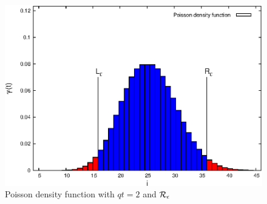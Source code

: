 \documentclass[a4paper,11pt]{article}
\begin{document}
	\begin{figure}[ht!]
		\begin{center}
			\includegraphics[scale=0.5, angle=0]{./poisson.eps}
		\end{center}
		\caption{Poisson density function with $qt=2$ and $\mathcal{R}_{\epsilon}$ \label{fig:poisson}}
	\end{figure}
	
\end{document}
